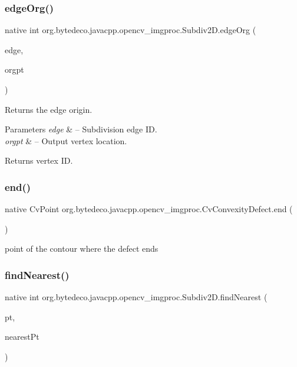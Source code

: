 \subsubsection{\texorpdfstring{edge\+Org()}{edgeOrg()}}
{\footnotesize\ttfamily native int org.\+bytedeco.\+javacpp.\+opencv\+\_\+imgproc.\+Subdiv2\+D.\+edge\+Org (\begin{DoxyParamCaption}\item[{int}]{edge,  }\item[{Point2f}]{orgpt }\end{DoxyParamCaption})}



Returns the edge origin. 


\begin{DoxyParams}{Parameters}
{\em edge} & – Subdivision edge ID. \\
\hline
{\em orgpt} & – Output vertex location. \\
\hline
\end{DoxyParams}
\begin{DoxyReturn}{Returns}
vertex ID. 
\end{DoxyReturn}
\mbox{\label{group__imgproc_ga615474a436d4aa8cf5e74cbc1648f50b}} 
\subsubsection{\texorpdfstring{end()}{end()}}
{\footnotesize\ttfamily native Cv\+Point org.\+bytedeco.\+javacpp.\+opencv\+\_\+imgproc.\+Cv\+Convexity\+Defect.\+end (\begin{DoxyParamCaption}{ }\end{DoxyParamCaption})}

point of the contour where the defect ends \mbox{\label{group__imgproc_gaf945545a23188d47dc1fdfb4332707be}} 
\subsubsection{\texorpdfstring{find\+Nearest()}{findNearest()}}
{\footnotesize\ttfamily native int org.\+bytedeco.\+javacpp.\+opencv\+\_\+imgproc.\+Subdiv2\+D.\+find\+Nearest (\begin{DoxyParamCaption}\item[{@By\+Val Point2f}]{pt,  }\item[{Point2f}]{nearest\+Pt }\end{DoxyParamCaption})}



